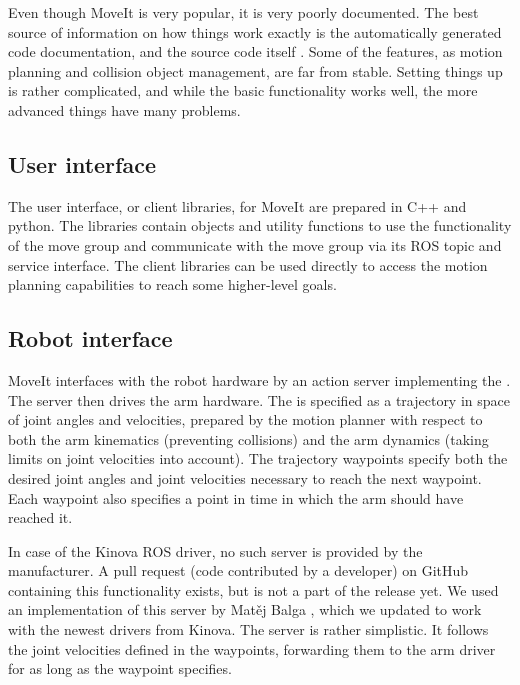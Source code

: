 \documentclass[buriama8_dp.tex]{subfiles}
\begin{document}
Even though MoveIt is very popular, it is very poorly documented. The best source of information on how things work exactly is the automatically generated code documentation, and the source code itself \cite{moveit_src}. Some of the features, as motion planning and collision object management, are far from stable. Setting things up is rather complicated, and while the basic functionality works well, the more advanced things have many problems.


\subsection{User interface}
\label{subsec:moveit_ui}

The user interface, or client libraries, for MoveIt are prepared in C++ and python. The libraries contain objects and utility functions to use the functionality of the move group and communicate with the move group via its ROS topic and service interface. The client libraries can be used directly to access the motion planning capabilities to reach some higher-level goals.


\subsection{Robot interface}
\label{subsec:moveit_ri}

MoveIt interfaces with the robot hardware by an action server implementing the . The server then drives the arm hardware. The  is specified as a trajectory in space of joint angles and velocities, prepared by the motion planner with respect to both the arm kinematics (preventing collisions) and the arm dynamics (taking limits on joint velocities into account). The trajectory waypoints specify both the desired joint angles and joint velocities necessary to reach the next waypoint. Each waypoint also specifies a point in time in which the arm should have reached it.

In case of the Kinova ROS driver, no such server is provided by the manufacturer. A pull request (code contributed by a developer) on GitHub containing this functionality exists, but is not a part of the release yet. We used an implementation of this server by Matěj Balga \cite{matej} , which we updated to work with the newest drivers from Kinova. The server is rather simplistic. It follows the joint velocities defined in the waypoints, forwarding them to the arm driver for as long as the waypoint specifies.
\end{document}

